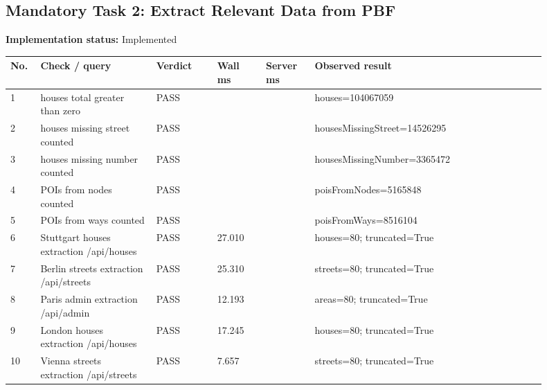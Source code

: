 \documentclass[10pt,a4paper]{article}
\begin{document}
\subsection{Mandatory Task 2: Extract Relevant Data from PBF}
\textbf{Implementation status:} Implemented\\
\scriptsize
\begin{longtable}{|P{0.045\linewidth}|P{0.19\linewidth}|P{0.105\linewidth}|P{0.085\linewidth}|P{0.085\linewidth}|P{0.385\linewidth}|}
\hline
\textbf{No.} & \textbf{Check / query} & \textbf{Verdict} & \textbf{Wall ms} & \textbf{Server ms} & \textbf{Observed result}\\ \hline
{} 1 & houses total greater than zero & PASS &  &  & houses=104067059\\ \hline
{} 2 & houses missing street counted & PASS &  &  & housesMissingStreet=14526295\\ \hline
{} 3 & houses missing number counted & PASS &  &  & housesMissingNumber=3365472\\ \hline
{} 4 & POIs from nodes counted & PASS &  &  & poisFromNodes=5165848\\ \hline
{} 5 & POIs from ways counted & PASS &  &  & poisFromWays=8516104\\ \hline
{} 6 & Stuttgart houses extraction /api/houses & PASS & 27.010 &  & houses=80; truncated=True\\ \hline
{} 7 & Berlin streets extraction /api/streets & PASS & 25.310 &  & streets=80; truncated=True\\ \hline
{} 8 & Paris admin extraction /api/admin & PASS & 12.193 &  & areas=80; truncated=True\\ \hline
{} 9 & London houses extraction /api/houses & PASS & 17.245 &  & houses=80; truncated=True\\ \hline
{} 10 & Vienna streets extraction /api/streets & PASS & 7.657 &  & streets=80; truncated=True\\ \hline
\end{longtable}
\normalsize
\end{document}
